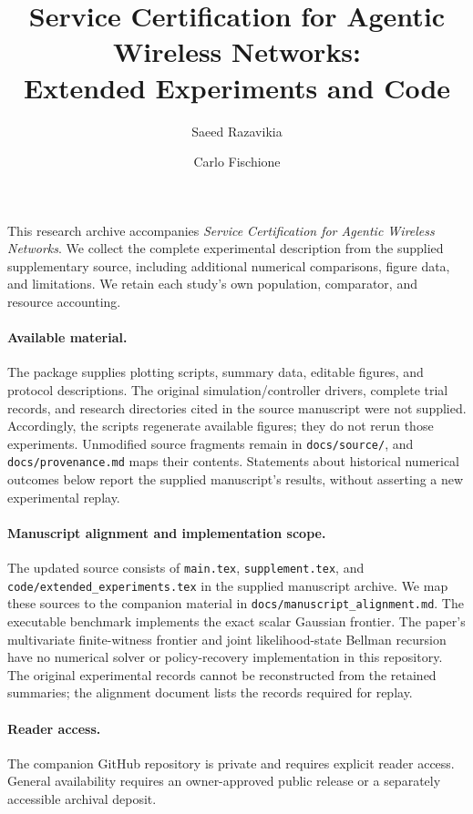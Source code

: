 \documentclass[11pt,a4paper]{article}
\title{Service Certification for Agentic Wireless Networks:\\Extended Experiments and Code}
\author{Saeed Razavikia \and Carlo Fischione}
\date{}
\begin{document}
\maketitle
This research archive accompanies \emph{Service Certification for Agentic Wireless Networks}. We collect the complete experimental description from the supplied supplementary source, including additional numerical comparisons, figure data, and limitations. We retain each study's own population, comparator, and resource accounting.

\paragraph{Available material.} The package supplies plotting scripts, summary data, editable figures, and protocol descriptions. The original simulation/controller drivers, complete trial records, and research directories cited in the source manuscript were not supplied. Accordingly, the scripts regenerate available figures; they do not rerun those experiments. Unmodified source fragments remain in \texttt{docs/source/}, and \texttt{docs/provenance.md} maps their contents. Statements about historical numerical outcomes below report the supplied manuscript's results, without asserting a new experimental replay.

\paragraph{Manuscript alignment and implementation scope.} The updated source consists of \texttt{main.tex}, \texttt{supplement.tex}, and \texttt{code/extended\_experiments.tex} in the supplied manuscript archive. We map these sources to the companion material in \texttt{docs/manuscript\_alignment.md}. The executable benchmark implements the exact scalar Gaussian frontier. The paper's multivariate finite-witness frontier and joint likelihood-state Bellman recursion have no numerical solver or policy-recovery implementation in this repository. The original experimental records cannot be reconstructed from the retained summaries; the alignment document lists the records required for replay.

\paragraph{Reader access.} The companion GitHub repository is private and requires explicit reader access. General availability requires an owner-approved public release or a separately accessible archival deposit.
\end{document}
